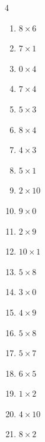 \begin{multicols}{4}
\begin{enumerate}
  \item $8\times 6$
        \phantom{$=48$}

  \item $7\times 1$
        \phantom{$=7$}

  \item $0\times 4$
        \phantom{$=0$}

  \item $7\times 4$
        \phantom{$=28$}

  \item $5\times 3$
        \phantom{$=15$}

  \item $8\times 4$
        \phantom{$=32$}

  \item $4\times 3$
        \phantom{$=12$}

  \item $5\times 1$
        \phantom{$=5$}

  \item $2\times 10$
        \phantom{$=20$}

  \item $9\times 0$
        \phantom{$=0$}

  \item $2\times 9$
        \phantom{$=18$}

  \item $10\times 1$
        \phantom{$=10$}

  \item $5\times 8$
        \phantom{$=40$}

  \item $3\times 0$
        \phantom{$=0$}

  \item $4\times 9$
        \phantom{$=36$}

  \item $5\times 8$
        \phantom{$=40$}

  \item $5\times 7$
        \phantom{$=35$}

  \item $6\times 5$
        \phantom{$=30$}

  \item $1\times 2$
        \phantom{$=2$}

  \item $4\times 10$
        \phantom{$=40$}

  \item $8\times 2$
        \phantom{$=16$}


\end{enumerate}
\end{multicols}
